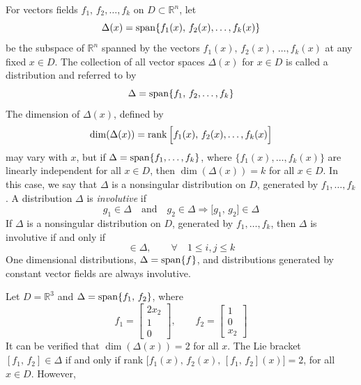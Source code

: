 \documentclass[12pt,a4paper,oneside]{book}
\begin{document}
\begin{onehalfspace}
For vectors fields $f_1,\,f_2,\dots,f_k$ on $D\subset\mathbb{R}^n$, let
\begin{equation*}
	\Delta(x)=\operatorname{span}\{f_1(x),\,f_2(x), \dots,f_k(x)\}
\end{equation*}
be the subspace of $\mathbb{R}^n$ spanned by the vectors 
$f_1(x),\,f_2(x),\,\dots,f_k(x)$ at any fixed $x\in D$. The collection of 
all 
vector spaces $\Delta(x)$ for $x\in D$ is called a distribution and referred 
to 
by
\begin{equation*}
	\Delta = \operatorname{span}\{f_1,\,f_2,\dots,f_k\}
\end{equation*}
The dimension of $\Delta(x)$, defined by
\begin{equation*}
	\dim(\Delta(x))=\rank\Big[f_1(x),\,f_2(x),\dots,f_k(x)\Big]
\end{equation*}
may vary with $x$, but if $\Delta=\operatorname{span}\{f_1,\dots,f_k\}$, where 
$\{f_1(x),\dots,f_k(x)\}$ are linearly independent for all $x\in D$, then 
$\dim(\Delta(x))=k$ for all $x\in D$. In this case, we say that $\Delta$ is 
a 
nonsingular distribution on $D$, generated by $f_1,\dots,f_k$. A 
distribution $\Delta$ is \textit{involutive} if
\begin{equation*}
	g_1\in\Delta\quad\text{and}\quad g_2\in\Delta\Rightarrow\big[g_1,\,g_2\big]\in\Delta
\end{equation*}
If $\Delta$ is a nonsingular distribution on $D$, generated by $f_1,\dots,f_k$, then $\Delta$ is involutive if and only if
\begin{equation*}
	[f_i,\,f_j]\in \Delta,\qquad\forall\quad 1\le i,j\le k
\end{equation*}
One dimensional distributions, $\Delta=\operatorname{span}\{f\}$, and distributions generated by constant vector fields are always involutive.
\begin{example}
	Let $D=\mathbb{R}^3$ and $\Delta =\operatorname{span}\{f_1,\,f_2\}$, where
	\begin{equation*}
		f_1=\begin{bmatrix} 2x_2 \\[6pt] 1 \\[6pt] 0 \end{bmatrix},\qquad
		f_2=\begin{bmatrix} 1 \\[6pt] 0 \\[6pt] x_2 \end{bmatrix}
	\end{equation*}
	It can be verified that $\dim(\Delta(x))=2$ for all $x$. The Lie bracket $[f_1,\,f_2]\in\Delta$ if and only if rank $\Big[f_1(x),\,f_2(x),\,[f_1,\,f_2](x)\Big]=2$, for all $x\in D$. However,

\end{example}
\end{onehalfspace}
\end{document}
